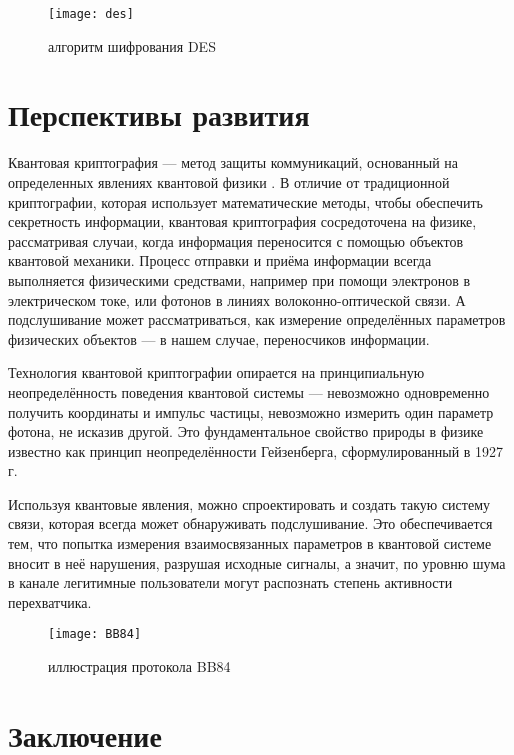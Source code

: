 \begin{figure}[H]
	\texttt{[image: des]}
	\centering
	\caption{алгоритм шифрования DES}
\end{figure}


\section{Перспективы развития}

Квантовая криптография — метод защиты коммуникаций, основанный на определенных явлениях квантовой физики \cite{ch1984quantum, lo2005decoy}. В отличие от традиционной криптографии, которая использует математические методы, чтобы обеспечить секретность информации, квантовая криптография сосредоточена на физике, рассматривая случаи, когда информация переносится с помощью объектов квантовой механики. Процесс отправки и приёма информации всегда выполняется физическими средствами, например при помощи электронов в электрическом токе, или фотонов в линиях волоконно-оптической связи. А подслушивание может рассматриваться, как измерение определённых параметров физических объектов — в нашем случае, переносчиков информации.

Технология квантовой криптографии опирается на принципиальную неопределённость поведения квантовой системы — невозможно одновременно получить координаты и импульс частицы, невозможно измерить один параметр фотона, не исказив другой. Это фундаментальное свойство природы в физике известно как принцип неопределённости Гейзенберга, сформулированный в 1927 г.

Используя квантовые явления, можно спроектировать и создать такую систему связи, которая всегда может обнаруживать подслушивание. Это обеспечивается тем, что попытка измерения взаимосвязанных параметров в квантовой системе вносит в неё нарушения, разрушая исходные сигналы, а значит, по уровню шума в канале легитимные пользователи могут распознать степень активности перехватчика.

\begin{figure}[H]
	\texttt{[image: BB84]}
	\centering
	\caption{иллюстрация протокола BB84}
\end{figure}

\clearpage

\section*{Заключение}

